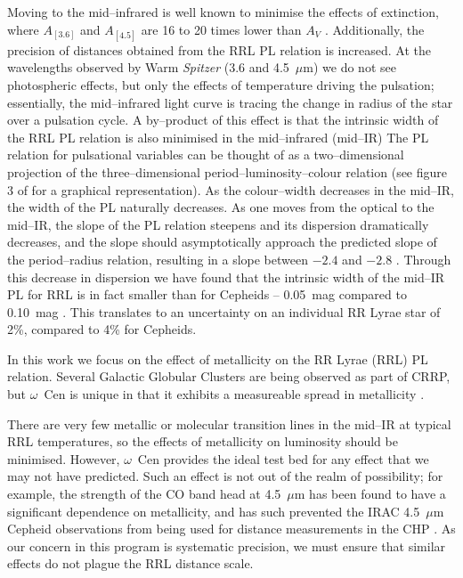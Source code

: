 \documentclass[a4paper,fleqn,usenatbib]{mnras}
\begin{document}
Moving to the mid--infrared is well known to minimise the effects of extinction, where $A_[3.6]$ and $A_[4.5]$ are 16 to 20 times lower than $A_V$ \citet{1989ApJ...345..245C, 2005ApJ...619..931I}. Additionally, the precision of distances obtained from the RRL PL relation is increased. At the wavelengths observed by Warm \textit{Spitzer} (3.6 and 4.5~$\mu$m) we do not see photospheric effects, but only the effects of temperature driving the pulsation; essentially, the mid--infrared light curve is tracing the change in radius of the star over a pulsation cycle. A by--product of this effect is that the intrinsic width of the RRL PL relation is also minimised in the mid--infrared (mid--IR) The PL relation for pulsational variables can be thought of as a two--dimensional projection of the three--dimensional period--luminosity--colour relation (see figure 3 of \citet{1991PASP..103..933M} for a graphical representation). As the colour--width decreases in the mid--IR, the width of the PL naturally decreases. As one moves from the optical to the mid--IR, the slope of the PL relation steepens and its dispersion dramatically decreases, and the slope should asymptotically approach the predicted slope of the period--radius relation, resulting in a slope between $-2.4$ and $-2.8$ \citep{2013ApJ...776..135M}. Through this decrease in dispersion we have found that the intrinsic width of the mid--IR PL for RRL is in fact smaller than for Cepheids -- 0.05~mag compared to 0.10~mag \citep[Monson et al. 2015, in prep,][]{2015arXiv150507858N}. This translates to an uncertainty on an individual RR Lyrae star of 2\%, compared to 4\% for Cepheids. 

In this work we focus on the effect of metallicity on the RR Lyrae (RRL) PL relation. Several Galactic Globular Clusters are being observed as part of CRRP, but $\omega$~Cen is unique in that it exhibits a measureable spread in metallicity \citep{1975ApJ...201L..71F, 2007ApJ...663..296V, 2014ApJ...791..107V}.

There are very few metallic or molecular transition lines in the mid--IR at typical RRL temperatures, so the effects of metallicity on luminosity should be minimised. However, $\omega$~Cen provides the ideal test bed for any effect that we may not have predicted. Such an effect is not out of the realm of possibility; for example, the strength of the CO band head at 4.5~$\mu$m has been found to have a significant dependence on metallicity, and has such prevented the IRAC 4.5~$\mu$m Cepheid observations from being used for distance measurements in the CHP \citep{2011ApJ...743...76S, 2012ApJ...759..146M, 2015arXiv150206995S}. As our concern in this program is systematic precision, we must ensure that similar effects do not plague the RRL distance scale.  
\end{document}

